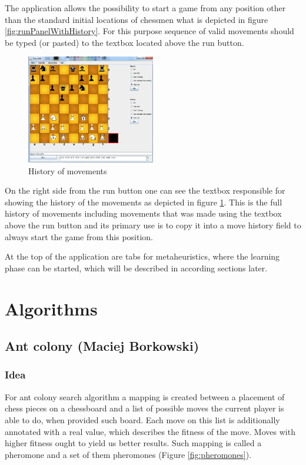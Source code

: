 \documentclass[pdftex]{article}
\begin{document}
The application allows the possibility to start a game from any position other than the standard initial locations of chessmen what is depicted in figure \ref{fig:runPanelWithHistory}. For this purpose sequence of valid movements should be typed (or pasted) to the textbox located above the run button.

\begin{figure}[!htb]
	\centering
	\includegraphics[width=0.5\textwidth]{chessImages/withHistoryAndGameHistory.png} 
	\caption{History of movements}
	\label{fig:runPanelWithMovementsHistory}
\end{figure}

On the right side from the run button one can see the textbox responsible for showing the history of the movements as depicted in figure \ref{fig:runPanelWithMovementsHistory}. This is the full history of movements including movements that was made using the textbox above the run button and its primary use is to copy it into a move history field to always start the game from this position.

At the top of the application are tabs for metaheuristics, where the learning phase can be started, which will be described in according sections later.

\section{Algorithms}
\label{sec:project}

\subsection{Ant colony (Maciej Borkowski)}
\label{sec:ant}

\subsubsection{Idea}
For ant colony search algorithm a mapping is created between a placement of chess pieces on a chessboard and a list of possible moves the current player is able to do, when provided such board. Each move on this list is additionally annotated with a real value, which describes the fitness of the move. Moves with higher fitness ought to yield us better results. Such mapping is called a pheromone and a set of them pheromones (Figure \ref{fig:pheromones}).
\end{document}
